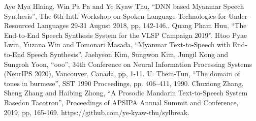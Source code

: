 \documentclass[journal,transmag]{JIISTjrnl}
\newcommand{\enquote}[1]{``#1''}
\begin{document}
%
%
%
\begin{thebibliography}{1}

 Aye Mya Hlaing, Win Pa Pa and Ye Kyaw Thu, \enquote{DNN based Myanmar Speech Synthesis}, The 6th Intl. Workshop on Spoken Language Technologies for Under-Resourced Languages 29-31 August 2018, pp, 142-146..
  Quang Pham Huu, \enquote{The End-to-End Speech Synthesis System for the
VLSP Campaign 2019}.
 Htoo Pyae Lwin, Yuzana Win and Tomonari Masada, \enquote{Myanmar Text-to-Speech with End-to-End Speech Synthesis}.
 Jaehyeon Kim, Sungwon Kim, Jungil Kong and Sungroh Yoon, \enquote{ooo}, 34th Conference on Neural Information Processing Systems (NeurIPS 2020), Vancouver, Canada, pp, 1-11.
U. Thein-Tun, \enquote{The domain of tones in burmese}, SST 1990 Proceedings, pp. 406--411, 1990.
Chuxiong Zhang, Sheng Zhang and Haibing Zhong, \enquote{A Prosodic Mandarin Text-to-Speech System Basedon Tacotron}, Proceedings of APSIPA Annual Summit and Conference, 2019, pp, 165-169.
https://github.com/ye-kyaw-thu/sylbreak.

\end{thebibliography}
\end{document}
